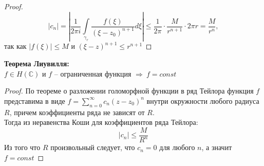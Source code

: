 \begin{proof}
	\ \\
	\begin{equation*}
		|c_n| = \left|\frac{1}{2 \pi i} \int \limits_{{\gamma}_r} \frac{f(\xi)}{(\xi - z_0)^{n+1}}d\xi\right| \leq \frac{1}{2 \pi} \cdot \frac{M}{r^{n+1}} \cdot 2 \pi r = \frac{M}{r^n},
	\end{equation*}
	так как $|f(\xi)| \leq M$ и $(\xi - z)^{n+1} \leq r^{n+1}$
\end{proof}


\textbf{Теорема Лиувилля:}\\[2mm]
$f \in H(\mathbb{C})$ и $f$ -- ограниченная функция $\Rightarrow \ f = const$ 


\begin{proof}
	По теореме о разложении голоморфной функции в ряд Тейлора 
	функция $f$ представима в виде $f = \sum_{n=0}^{\infty} c_n (z - z_0)^n$ внутри окружности любого радиуса $R$,
	причем коэффициенты ряда не зависят от $R$.\\[2mm]
	Тогда из неравенства Коши для коэффициентов ряда Тейлора:
	$$
	|c_n| \leq \frac{M}{R^n}
	$$
	Из того что $R$ произвольный следует, что $c_n = 0$ для
	любого $n$, а значит $f = const$
\end{proof}


